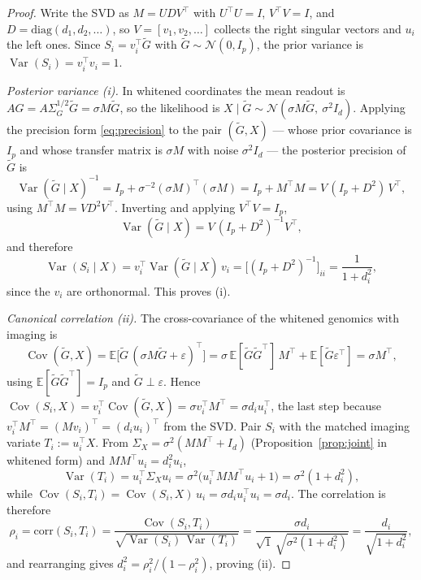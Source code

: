 \documentclass{article}
\newcommand{\E}{\mathbb{E}}
\newcommand{\N}{\mathcal{N}}
\newcommand{\Cov}{\operatorname{Cov}}
\newcommand{\Var}{\operatorname{Var}}
\newcommand{\Sg}{\Sigma_{G}}
\newcommand{\Sx}{\Sigma_{X}}
\newcommand{\T}{^{\top}}
\begin{document}
\begin{proof}
Write the SVD as $M = U D V\T$ with $U\T U = I$, $V\T V = I$, and
$D = \mathrm{diag}(d_1, d_2, \dots)$, so $V = [v_1, v_2, \dots]$ collects the
right singular vectors and $u_i$ the left ones. Since $S_i = v_i\T \tilde{G}$ with
$\tilde{G} \sim \N(0, I_p)$, the prior variance is $\Var(S_i) = v_i\T v_i = 1$.  %

\emph{Posterior variance (i).} In whitened coordinates the mean readout is
$AG = A\Sg^{1/2} \tilde{G} = \sigma M \tilde{G}$, so the likelihood is
$X \mid \tilde{G} \sim \N(\sigma M \tilde{G},\ \sigma^2 I_d)$. Applying the precision form
\eqref{eq:precision} to the pair $(\tilde{G}, X)$ --- whose prior covariance is $I_p$ and
whose transfer matrix is $\sigma M$ with noise $\sigma^2 I_d$ --- the posterior
precision of $\tilde{G}$ is  %
\[
\Var(\tilde{G} \mid X)^{-1}
= I_p + \sigma^{-2}(\sigma M)\T(\sigma M)
= I_p + M\T M  %
= V\,(I_p + D^2)\,V\T,  %
\]
using $M\T M = V D^2 V\T$. Inverting and applying $V\T V = I_p$,
\[
\Var(\tilde{G} \mid X) = V\,(I_p + D^2)^{-1} V\T,
\]
and therefore
\[
\Var(S_i \mid X)
= v_i\T \Var(\tilde{G} \mid X)\, v_i
= \big[(I_p + D^2)^{-1}\big]_{ii}
= \frac{1}{1 + d_i^2},
\]
since the $v_i$ are orthonormal. This proves (i).

\emph{Canonical correlation (ii).} The cross-covariance of the whitened genomics
with imaging is
\[
\Cov(\tilde{G}, X) = \E\!\big[\tilde{G}\,(\sigma M \tilde{G} + \varepsilon)\T\big]
= \sigma\,\E[\tilde{G} \tilde{G}\T]\,M\T + \E[\tilde{G}\varepsilon\T]
= \sigma M\T,
\]
using $\E[\tilde{G}\tilde{G}\T] = I_p$ and $\tilde{G}\perp\varepsilon$. Hence
$\Cov(S_i, X) = v_i\T \Cov(\tilde{G}, X) = \sigma v_i\T M\T = \sigma d_i u_i\T$, the last
step because $v_i\T M\T = (M v_i)\T = (d_i u_i)\T$ from the SVD. Pair $S_i$ with the matched imaging variate
$T_i := u_i\T X$. From $\Sx = \sigma^2(MM\T + I_d)$ (Proposition~\ref{prop:joint}
in whitened form) and $M M\T u_i = d_i^2 u_i$,
\[
\Var(T_i) = u_i\T \Sx u_i = \sigma^2\big(u_i\T M M\T u_i + 1\big)
= \sigma^2(1 + d_i^2),
\]
while $\Cov(S_i, T_i) = \Cov(S_i, X)\, u_i = \sigma d_i u_i\T u_i = \sigma d_i$.
The correlation is therefore
\[
\rho_i = \mathrm{corr}(S_i, T_i)
= \frac{\Cov(S_i, T_i)}{\sqrt{\Var(S_i)\,\Var(T_i)}}
= \frac{\sigma d_i}{\sqrt{1}\,\sqrt{\sigma^2(1+d_i^2)}}
= \frac{d_i}{\sqrt{1 + d_i^2}},
\]
and rearranging gives $d_i^2 = \rho_i^2/(1-\rho_i^2)$, proving (ii).


\end{proof}
\end{document}
